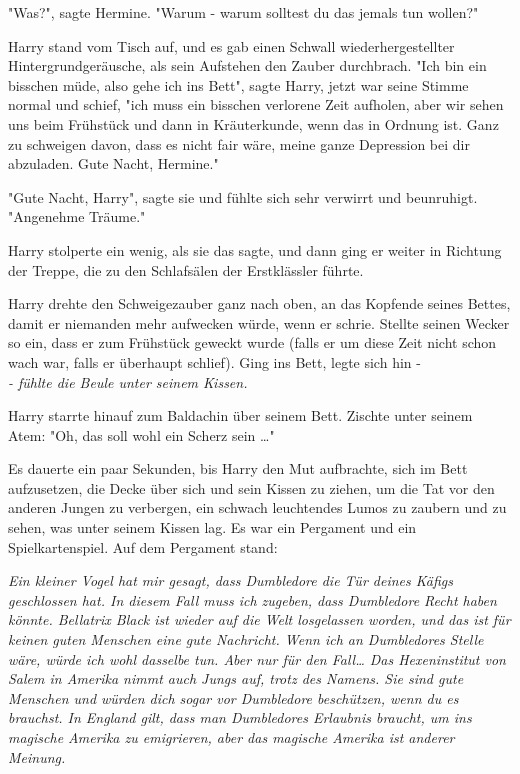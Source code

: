 {"Was?", sagte Hermine. "Warum - warum solltest du das jemals tun wollen?"

Harry stand vom Tisch auf, und es gab einen Schwall wiederhergestellter Hintergrundgeräusche, als sein Aufstehen den Zauber durchbrach. "Ich bin ein bisschen müde, also gehe ich ins Bett", sagte Harry, jetzt war seine Stimme normal und schief, "ich muss ein bisschen verlorene Zeit aufholen, aber wir sehen uns beim Frühstück und dann in Kräuterkunde, wenn das in Ordnung ist. Ganz zu schweigen davon, dass es nicht fair wäre, meine ganze Depression bei dir abzuladen. Gute Nacht, Hermine."

"Gute Nacht, Harry", sagte sie und fühlte sich sehr verwirrt und beunruhigt. "Angenehme Träume."

Harry stolperte ein wenig, als sie das sagte, und dann ging er weiter in Richtung der Treppe, die zu den Schlafsälen der Erstklässler führte.

Harry drehte den Schweigezauber ganz nach oben, an das Kopfende seines Bettes, damit er niemanden mehr aufwecken würde, wenn er schrie. Stellte seinen Wecker so ein, dass er zum Frühstück geweckt wurde (falls er um diese Zeit nicht schon wach war, falls er überhaupt schlief). Ging ins Bett, legte sich hin -\\ \emph{\hfill\break - fühlte die Beule unter seinem Kissen.}

Harry starrte hinauf zum Baldachin über seinem Bett. Zischte unter seinem Atem: "Oh, das soll wohl ein Scherz sein …"

Es dauerte ein paar Sekunden, bis Harry den Mut aufbrachte, sich im Bett aufzusetzen, die Decke über sich und sein Kissen zu ziehen, um die Tat vor den anderen Jungen zu verbergen, ein schwach leuchtendes Lumos zu zaubern und zu sehen, was unter seinem Kissen lag. Es war ein Pergament und ein Spielkartenspiel. Auf dem Pergament stand:

\emph{Ein kleiner Vogel hat mir gesagt, dass Dumbledore die Tür deines Käfigs geschlossen hat. In diesem Fall muss ich zugeben, dass Dumbledore Recht haben könnte. Bellatrix Black ist wieder auf die Welt losgelassen worden, und das ist für keinen guten Menschen eine gute Nachricht. Wenn ich an Dumbledores Stelle wäre, würde ich wohl dasselbe tun. Aber nur für den Fall… Das Hexeninstitut von Salem in Amerika nimmt auch Jungs auf, trotz des Namens. Sie sind gute Menschen und würden dich sogar vor Dumbledore beschützen, wenn du es brauchst. In England gilt, dass man Dumbledores Erlaubnis braucht, um ins magische Amerika zu emigrieren, aber das magische Amerika ist anderer Meinung.}

}
